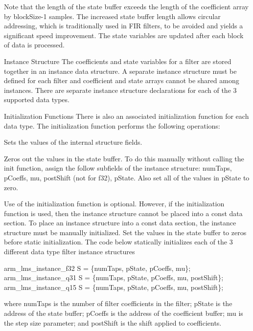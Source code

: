 \begin{DoxyParagraph}{}
Note that the length of the state buffer exceeds the length of the coefficient array by {\ttfamily block\+Size-\/1} samples. The increased state buffer length allows circular addressing, which is traditionally used in F\+IR filters, to be avoided and yields a significant speed improvement. The state variables are updated after each block of data is processed. 
\end{DoxyParagraph}
\begin{DoxyParagraph}{Instance Structure}
The coefficients and state variables for a filter are stored together in an instance data structure. A separate instance structure must be defined for each filter and coefficient and state arrays cannot be shared among instances. There are separate instance structure declarations for each of the 3 supported data types.
\end{DoxyParagraph}
\begin{DoxyParagraph}{Initialization Functions}
There is also an associated initialization function for each data type. The initialization function performs the following operations\+:
\begin{DoxyItemize}
\item Sets the values of the internal structure fields.
\item Zeros out the values in the state buffer. To do this manually without calling the init function, assign the follow subfields of the instance structure\+: num\+Taps, p\+Coeffs, mu, post\+Shift (not for f32), p\+State. Also set all of the values in p\+State to zero.
\end{DoxyItemize}
\end{DoxyParagraph}
\begin{DoxyParagraph}{}
Use of the initialization function is optional. However, if the initialization function is used, then the instance structure cannot be placed into a const data section. To place an instance structure into a const data section, the instance structure must be manually initialized. Set the values in the state buffer to zeros before static initialization. The code below statically initializes each of the 3 different data type filter instance structures 
\begin{DoxyPre}
    arm\_lms\_instance\_f32 S = \{numTaps, pState, pCoeffs, mu\};
    arm\_lms\_instance\_q31 S = \{numTaps, pState, pCoeffs, mu, postShift\};
    arm\_lms\_instance\_q15 S = \{numTaps, pState, pCoeffs, mu, postShift\};
 \end{DoxyPre}
 where {\ttfamily num\+Taps} is the number of filter coefficients in the filter; {\ttfamily p\+State} is the address of the state buffer; {\ttfamily p\+Coeffs} is the address of the coefficient buffer; {\ttfamily mu} is the step size parameter; and {\ttfamily post\+Shift} is the shift applied to coefficients.
\end{DoxyParagraph}
